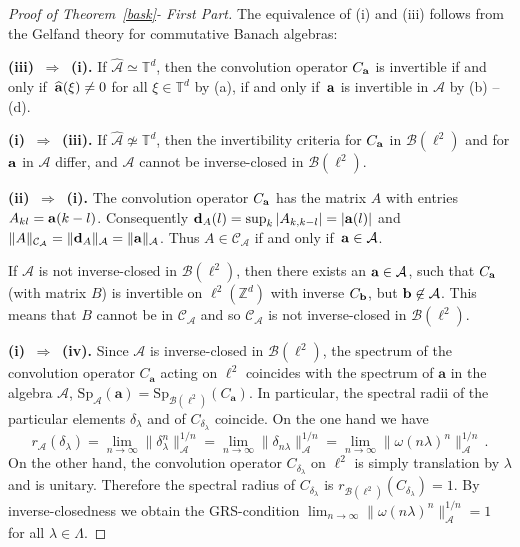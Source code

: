\documentclass[12pt]{amsart}
\theoremstyle{definition}
\theoremstyle{remark}
\numberwithin{equation}{section}
\def\cB{\mathcal{B}}
\def\cA{\mathcal{A}}
\def\bZ{{\mathbb{Z}}}
\def\bT{{\mathbb{T}}}
\def\cca{\Cal C_\ac}
\def\zd{\bZ^d}
\def\cB{\mathcal{B}}
\def\cA{\mathcal{A}}
\newcommand{\bba}{{\bf a}}
\newcommand{\bbb}{{\bf b}}
\newcommand{\bbd}{{\bf d}}
\newcommand{\fif}{if and only if}
\newcommand{\Cal}{\mathcal}
\newcommand{\ac}{\Cal A}
\begin{document}
\begin{proof}[Proof  of Theorem~\ref{bask}- First Part]
The equivalence of (i) and (iii)  follows  from the Gelfand theory
for commutative Banach algebras:

\textbf{(iii) $\, \Rightarrow \, $ (i).}  If $ \widehat{\cA }
\simeq \bT ^d$, then  the convolution operator $C_{\bba } $ is
invertible \fif\ $\widehat{\bba}(\xi ) \neq 0 $ for all $\xi \in
\bT ^d$ by (a), \fif\ $\bba $ is invertible  in $\cA $ by (b) --
(d).

\textbf{(i) $\, \Rightarrow \, $ (iii).} If $ \widehat{\cA } \not
\simeq \bT ^d$, then the invertibility criteria for $C_{\bba } $
in $\cB (\ell ^2)$ and for $\bba $ in $\cA $ differ, and $\cA $
cannot be inverse-closed in $\cB (\ell ^2)$.


\textbf{(ii) $\, \Rightarrow \, $ (i).} The convolution operator
$C_{\bba }$ has the  matrix $A$ with entries $A_{kl}=\bba(k-l)$.
Consequently $\bbd_A (l) = \sup _{k} |A_{k,k-l}|= |\bba(l)|$ and
$\|A\|_{\cca } = \|\bbd_A\|_{\cA } = \|\bba \|_{\cA }$. Thus $A
\in \cca $ \fif\ $\bba \in \cA $.

If $\cA $ is not inverse-closed in $\cB (\ell ^2)$, then there
exists an $\bba \in \cA $, such that $C_{\bba } $ (with matrix
$B$)  is invertible on $\ell ^2 (\zd )$  with inverse $C_{\bbb }
$, but $\bbb \not \in \cA $. This means that $B$ cannot be in
$\cca $ and so $\cca $ is not inverse-closed in $\cB (\ell ^2)$.

\textbf{(i) $\, \Rightarrow \, $ (iv).} Since $\cA $ is inverse-closed
in $\cB (\ell ^2)$, the spectrum of the convolution operator
$C_{\mathbf{a}}$ acting on $\ell ^2$ coincides with the spectrum of
$\mathbf{a}$ in the algebra $\cA$, $\mathrm{Sp}_{\cA}(\mathbf{a}) =
\mathrm{Sp}_{\cB (\ell ^2)} (C_\mathbf{a})$. In particular, the
spectral radii of the particular elements $\delta _\lambda $ and of
$C_{\delta _\lambda}$ coincide. On the
one hand we have
$$
r_{\cA }(\delta _\lambda) = \lim _{n\to \infty } \|\delta _\lambda
^n\|_\cA ^{1/n} =  \lim _{n\to \infty } \|\delta _{n\lambda}
\|_\cA ^{1/n} = \lim _{n\to \infty } \|\omega (n\lambda ) 
^n\|_\cA ^{1/n}  \, .
$$
On the other hand, the convolution operator $C_{\delta _\lambda }$ on
$\ell ^2$ is simply  translation by $\lambda $ and is
unitary. Therefore the spectral radius of $C_{\delta _\lambda } $ is
$r_{\cB (\ell ^2)} (C_{\delta _\lambda  }) = 1$. By inverse-closedness
  we obtain the GRS-condition
   $\lim _{n\to \infty } \|\omega (n\lambda ) 
^n\|_\cA ^{1/n}   = 1$ for all $\lambda \in \Lambda $. 


\end{proof}
\end{document}
